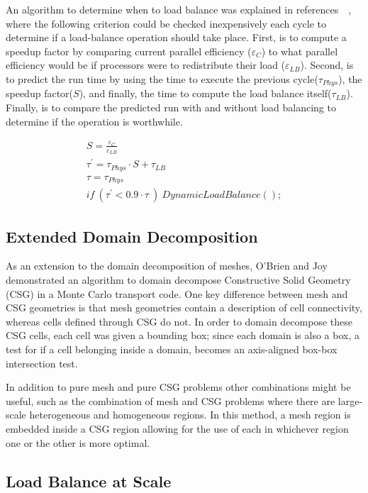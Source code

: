 An algorithm to determine when to load balance was explained in references~\cite{procassini2005load}~\cite{o2005dynamic}, where the following criterion could be checked inexpensively each cycle to determine if a load-balance operation should take place.
%
First, is to compute a speedup factor by comparing current parallel efficiency ($ \varepsilon_C $) to what parallel efficiency would be if processors were to redistribute their load ($ \varepsilon_{LB} $).
%
Second, is to predict the run time by using the time to execute the previous cycle($ \tau_{Phys} $), the speedup factor($S$), and finally, the time to compute the load balance itself($ \tau_{LB} $).
%
Finally, is to compare the predicted run with and without load balancing to determine if the operation is worthwhile.~\cite{o2005dynamic}


\begin{eqnarray}
S = \frac{\varepsilon_C}{\varepsilon_{LB}} \\
\tau^{'} = \tau_{Phys} \cdot S + \tau_{LB} \\
\tau = \tau_{Phys} \\
if\ (\tau^{'} < 0.9 \cdot \tau \ )\ DynamicLoadBalance();
\end{eqnarray}

\subsection*{Extended Domain Decomposition}

As an extension to the domain decomposition of meshes, O'Brien and Joy demonstrated an algorithm to domain decompose Constructive Solid Geometry (CSG) in a Monte Carlo transport code.
%
One key difference between mesh and CSG geometries is that mesh geometries contain a description of cell connectivity, whereas cells defined through CSG do not.
%
In order to domain decompose these CSG cells, each cell was given a bounding box; since each domain is also a box, a test for if a cell belonging inside a domain, becomes an axis-aligned box-box intersection test.~\cite{o2009domain}
%

In addition to pure mesh and pure CSG problems other combinations might be useful, such as the combination of mesh and CSG problems where there are large-scale heterogeneous and homogeneous regions.
%
In this method, a mesh region is embedded inside a CSG region allowing for the use of each in whichever region one or the other is more optimal.
~\cite{greenman2009enhancements}

\subsection*{Load Balance at Scale}

